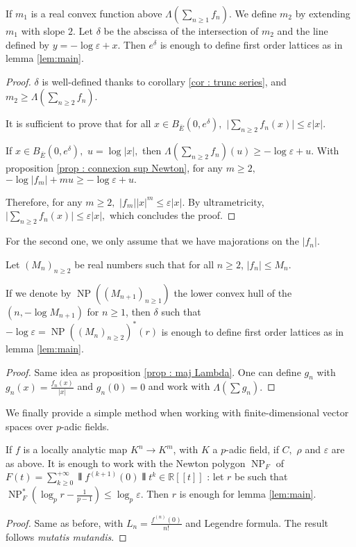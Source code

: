 \documentclass{lms}
\DeclareMathOperator{\NP}{NP}
\begin{document}
\begin{prop} \label{prop : maj Lambda} \label{prop:locanalytic}
If $m_1$ is a real convex function above $\Lambda(\sum_{n \geq 1}f_n)$.
We define $m_2$ by extending $m_1$ with slope $2$.
Let $\delta$ be the abscissa of the intersection of $m_2$ and the line defined by $y=-\log \varepsilon+ x.$ Then $e^\delta$ is enough to define first order lattices as in lemma  \ref{lem:main}.
\end{prop}
\begin{proof}
$\delta$ is well-defined thanks to corollary \ref{cor : trunc series}, and $m_2 \geq \Lambda(\sum_{n \geq 2}f_n).$

It is sufficient to prove that for all $x \in B_{\overline{E}}(0,e^\delta),$ $\vert \sum_{n\geq 2} f_n(x) \vert \leq \varepsilon \vert x \vert.$

If $x \in B_{\overline{E}}(0,e^\delta),$ $u = \log \vert x \vert,$ then $\Lambda( \sum_{n \geq 2}f_n)(u) \geq -\log \varepsilon+ u.$
With proposition \ref{prop : connexion sup Newton}, for any $m \geq 2,$ $-\log \vert f_m \vert +m u \geq -\log \varepsilon+ u.$

Therefore, for any $m \geq 2,$ $\vert f_m \vert  \vert x \vert^m \leq \varepsilon \vert x \vert.$
By ultrametricity,   $\vert \sum_{n\geq 2} f_n(x) \vert \leq \varepsilon \vert x \vert,$ which concludes the proof.
\end{proof}

For the second one, we only assume that we have majorations on the $\vert f_n \vert.$

\begin{prop}
Let $(M_n)_{n \geq 2}$ be real numbers such that for all $n \geq 2$, $\vert f_n \vert \leq M_n.$

If we denote by $\NP((M_{n+1})_{n \geq 1})$ the lower convex hull of the $(n, -\log M_{n+1})$ for $n \geq 1$, then $\delta$ such that $-\log \varepsilon=\NP((M_n)_{n \geq 2})^*(r)$ is enough to define first order lattices as in lemma  \ref{lem:main}.
\end{prop}
\begin{proof}
Same idea as proposition \ref{prop : maj Lambda}. One can define $g_n$ with $g_n (x) =\frac{f_n(x)}{\vert x \vert}$ and $g_n(0)=0$ and work with $\Lambda ( \sum g_n).$
\end{proof}

We finally provide a simple method when working with finite-dimensional vector spaces over $p$-adic fields.

\begin{prop} \label{prop : locanalyticfinitedim}
If $f$ is a locally analytic map $K^n \rightarrow K^m$, with $K$ a $p$-adic field, if $C,$ $\rho$ and $\varepsilon$ are as above. It is enough to work with the Newton polygon $\NP_F$ of $F(t) = \sum_{k\geq 0}^{+\infty} \interleave f^{(k+1)}(0) \interleave  t^k \in \mathbb{R}[[t]]$ : let $r$ be such that $\NP_F^* \left( \log_p r - \frac{1}{p-1} \right) \leq \log_p \varepsilon.$ Then $r$ is enough for lemma \ref{lem:main}. 
\end{prop}
\begin{proof}
Same as before, with $L_n=\frac{f^{(n)}(0)}{n!}$ and Legendre formula. The result follows \textit{mutatis mutandis}.
\end{proof}
\end{document}
